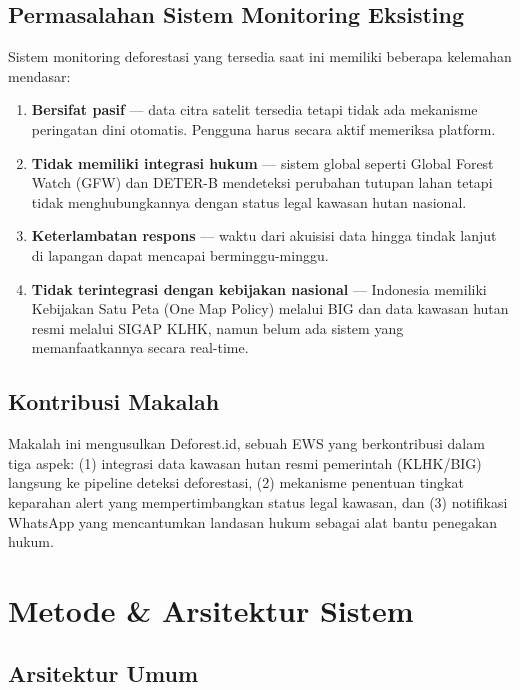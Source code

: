 \documentclass[10pt,conference,a4paper]{IEEEtran}
\begin{document}
\subsection{Permasalahan Sistem Monitoring Eksisting}

Sistem monitoring deforestasi yang tersedia saat ini memiliki beberapa
kelemahan mendasar:

\begin{enumerate}
    \item \textbf{Bersifat pasif} --- data citra satelit tersedia
    tetapi tidak ada mekanisme peringatan dini otomatis. Pengguna
    harus secara aktif memeriksa platform.
    \item \textbf{Tidak memiliki integrasi hukum} --- sistem global
    seperti Global Forest Watch (GFW) dan DETER-B mendeteksi
    perubahan tutupan lahan tetapi tidak menghubungkannya dengan
    status legal kawasan hutan nasional.
    \item \textbf{Keterlambatan respons} --- waktu dari akuisisi data
    hingga tindak lanjut di lapangan dapat mencapai berminggu-minggu.
    \item \textbf{Tidak terintegrasi dengan kebijakan nasional} ---
    Indonesia memiliki Kebijakan Satu Peta (One Map Policy) melalui
    BIG dan data kawasan hutan resmi melalui SIGAP KLHK, namun belum
    ada sistem yang memanfaatkannya secara real-time.
\end{enumerate}

\subsection{Kontribusi Makalah}

Makalah ini mengusulkan Deforest.id, sebuah EWS yang berkontribusi
dalam tiga aspek: (1) integrasi data kawasan hutan resmi pemerintah
(KLHK/BIG) langsung ke pipeline deteksi deforestasi, (2) mekanisme
penentuan tingkat keparahan alert yang mempertimbangkan status legal
kawasan, dan (3) notifikasi WhatsApp yang mencantumkan landasan hukum
sebagai alat bantu penegakan hukum.

\section{Metode \& Arsitektur Sistem}

\subsection{Arsitektur Umum}
\end{document}
